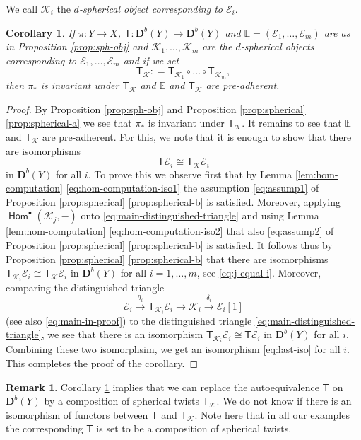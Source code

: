 \documentclass[a4paper,11pt, reqno]{amsart}
\def\E{\mathbb E}
\def\DD{\mathbf D}
\def\sE{\mathscr{E}}
\def\sK{\mathscr{K}}
\newcommand{\opname}[1]{\operatorname{\mathsf{#1}}}
\newcommand{\Hom}{\opname{Hom}}
\def\Db{\DD^b}
\newcommand{\bT}{\mathsf{T}}
\theoremstyle{plain}
\newtheorem{corollary}[dummy]{Corollary}
\theoremstyle{definition}
\newtheorem{remark}[dummy]{Remark}
\numberwithin{equation}{section}
\newlength{\arrow}
\begin{document}
We call $\sK_i$ the \emph{$d$-spherical object corresponding to $\sE_i$}.

\begin{corollary}\label{cor:T-vs-TK}
    If $\pi : Y  \to X$, $\bT : \Db(Y) \to \Db(Y) $ and $\E = ( \sE_1 , \ldots , \sE_m )$ are as in Proposition \ref{prop:sph-obj} and $\sK_1 , \ldots , \sK_m$ are  the $d$-spherical objects corresponding to $\sE_1 , \ldots  , \sE_m $ and if we set
    \[
       \bT_{\sK} : = \bT_{\sK_1} \circ \ldots \circ \bT_{\sK_m} ,
    \]
    then $\pi_\ast$ is invariant under $\bT_{\sK}$ and $\E$ and $\bT_{\sK}$ are pre-adherent.
\end{corollary}

\begin{proof}
    By Proposition \ref{prop:sph-obj} and Proposition \ref{prop:spherical} \ref{prop:spherical-a} we see  that $\pi_\ast$ is invariant under $\bT_{\sK}$.
It remains to see that $\E$ and $\bT_{\sK}$ are pre-adherent.
For this, we note that it is enough to show that there are isomorphisms 
\begin{equation}\label{eq:last-iso}
    \bT \sE_i \cong \bT_{\sK} \sE_i
\end{equation}
in $\Db(Y)$ for all $i$.
To prove this we observe first that by Lemma \ref{lem:hom-computation} \eqref{eq:hom-computation-iso1} the assumption \eqref{eq:assump1} of Proposition \eqref{prop:spherical} \ref{prop:spherical-b} is satisfied.
Moreover, applying $\Hom^\bullet ( \sK_j , -  )$ onto \eqref{eq:main-distinguished-triangle} and using Lemma \ref{lem:hom-computation} \eqref{eq:hom-computation-iso2} that also \eqref{eq:assump2} of Proposition \eqref{prop:spherical} \ref{prop:spherical-b} is satisfied.
It follows thus by Proposition \eqref{prop:spherical} \ref{prop:spherical-b} that there are isomorphisms $\bT_{\sK_i} \sE_i \cong \bT_{\sK} \sE_i $ in $\Db(Y)$ for all $i = 1 , \ldots , m$, see \eqref{eq:j-equal-i}.
Moreover, comparing the distinguished triangle 
\[
\sE_i \xrightarrow{\eta_i} \bT_{\sK_i} \sE_i \to \sK_i \xrightarrow{\delta_i} \sE_i [1]
\]
(see also \eqref{eq:main-in-proof}) to the distinguished triangle \eqref{eq:main-distinguished-triangle}, we see that there is an isomorphism $\bT_{\sK_i} \sE_i \cong \bT \sE_i$ in $\Db(Y)$ for all $i$.
Combining these two isomorphsim, we get an isomorphism \eqref{eq:last-iso} for all $i$.
This completes the proof of the corollary.
\end{proof}

\begin{remark}\label{rmk:T-vs-TK}
    Corollary \ref{cor:T-vs-TK} implies that we can replace the autoequivalence $\bT$ on $\Db(Y)$ by a composition of spherical twists $\bT_{\sK}$.
    We do not know if there is an isomorphism of functors between $\bT$ and $\bT_{\sK}$.
    Note here that in all our examples the corresponding $\bT$ is set to be a composition of spherical twists.
\end{remark}
\end{document}

